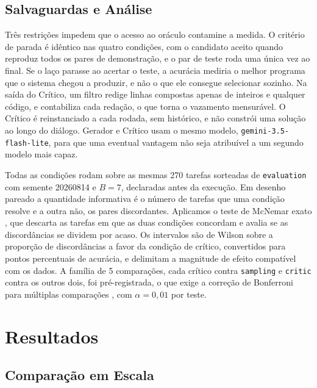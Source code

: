 \documentclass[letterpaper]{article} %
\newcommand{\modelo}{\texttt{gemini-3.5-flash-lite}}
\newcommand{\orcamento}{7}
\newcommand{\semente}{20260814}
\newcommand{\divisao}{\texttt{evaluation}}
\newcommand{\alfaBonf}{0{,}01}
\newcommand{\numComparacoes}{5}
\newcommand{\An}{270}
\begin{document}
\subsection{Salvaguardas e Análise}

Três restrições impedem que o acesso ao oráculo contamine a medida. O critério de
parada é idêntico nas quatro condições, com o candidato aceito quando reproduz
todos os pares de demonstração, e o par de teste roda uma única vez ao final. Se
o laço parasse ao acertar o teste, a acurácia mediria o melhor programa que o
sistema chegou a produzir, e não o que ele consegue selecionar sozinho. Na saída
do Crítico, um filtro redige linhas compostas apenas de inteiros e qualquer
código, e contabiliza cada redação, o que torna o vazamento mensurável. O Crítico
é reinstanciado a cada rodada, sem histórico, e não constrói uma solução ao longo
do diálogo. Gerador e Crítico usam o mesmo modelo, \modelo{}, para que uma
eventual vantagem não seja atribuível a um segundo modelo mais capaz.

Todas as condições rodam sobre as mesmas \An{} tarefas sorteadas de \divisao{}
com semente \semente{} e $B = \orcamento$, declaradas antes da execução. Em
desenho pareado a quantidade informativa é o número de tarefas que uma condição
resolve e a outra não, os pares discordantes. Aplicamos o teste de McNemar exato
\citep{mcnemar:47}, que descarta as tarefas em que as duas condições concordam e
avalia se as discordâncias se dividem por acaso. Os intervalos são de Wilson
\citep{wilson:27} sobre a proporção de discordâncias a favor da condição de
crítico, convertidos para pontos percentuais de acurácia, e delimitam a magnitude
de efeito compatível com os dados. A família de \numComparacoes{} comparações,
cada crítico contra \texttt{sampling} e \texttt{critic} contra os outros dois,
foi pré-registrada, o que exige a correção de Bonferroni para múltiplas
comparações \citep{dunn:61}, com $\alpha = \alfaBonf$ por teste.

\section{Resultados}

\subsection{Comparação em Escala}
\end{document}
